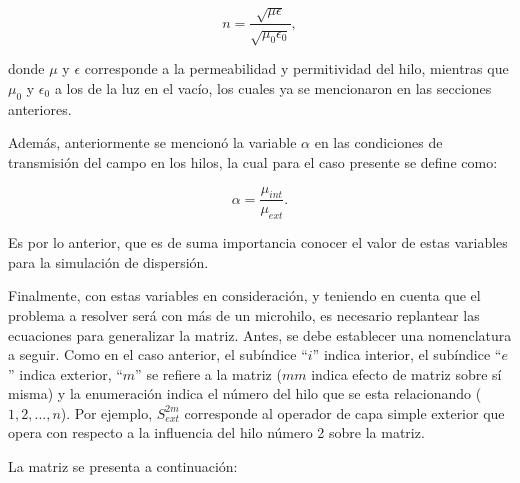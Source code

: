 \documentclass[12pt,letterpaper]{report}
\numberwithin{equation}{section}
\begin{document}
\begin{equation}
n = \frac{\sqrt{\mu\epsilon}}{\sqrt{\mu_0\epsilon_0}},
\end{equation}

\noindent donde $\mu$ y $\epsilon$ corresponde a la permeabilidad y permitividad del hilo, mientras que $\mu_{0}$ y $\epsilon_{0}$ a los de la luz en el vacío, los cuales ya se mencionaron en las secciones anteriores.

Además, anteriormente se mencionó la variable $\alpha$ en las condiciones de transmisión del campo en los hilos, la cual para el caso presente se define como:

\begin{equation}
\alpha = \frac{\mu_{int}}{\mu_{ext}}.
\end{equation} 

Es por lo anterior, que es de suma importancia conocer el valor de estas variables para la simulación de dispersión.

Finalmente, con estas variables en consideración, y teniendo en cuenta que el problema a resolver será con más de un microhilo, es necesario replantear las ecuaciones para generalizar la matriz. Antes, se debe establecer una nomenclatura a seguir. Como en el caso anterior, el subíndice ``$i$'' indica interior, el subíndice ``$e$'' indica exterior, ``$m$'' se refiere a la matriz ($mm$ indica efecto de matriz sobre sí misma) y la enumeración indica el número del hilo que se esta relacionando ($1,2,...,n$). Por ejemplo, $S_{ext}^{2m}$ corresponde al operador de capa simple exterior que opera con respecto a la influencia del hilo número 2 sobre la matriz.

La matriz se presenta a continuación:
\end{document}
